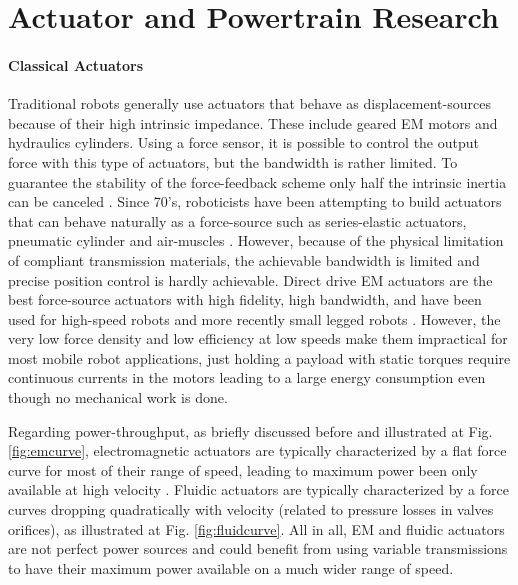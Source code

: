 \section{Actuator and Powertrain Research}
\label{sec:actres}

\paragraph{Classical Actuators} Traditional robots generally use actuators that behave as displacement-sources because of their high intrinsic impedance. These include geared EM motors and hydraulics cylinders. Using a force sensor, it is possible to control the output force with this type of actuators, but the bandwidth is rather limited. To guarantee the stability of the force-feedback scheme only half the intrinsic inertia can be canceled \cite{hogan_impedance_2004}. Since 70's, roboticists have been attempting to build actuators that can behave naturally as a force-source such as series-elastic actuators, pneumatic cylinder and air-muscles \cite{hanafusa_stable_1977}\cite{pratt_series_1995}. However, because of the physical limitation of compliant transmission materials, the achievable bandwidth is limited and precise position control is hardly achievable. Direct drive EM actuators are the best force-source actuators with high fidelity, high bandwidth, and have been used for high-speed robots \cite{asada_direct-drive_1987} and more recently small legged robots \cite{kenneally_design_2016}. However, the very low force density \cite{hollerbach_comparative_1992} and low efficiency at low speeds make them impractical for most mobile robot applications, just holding a payload with static torques require continuous currents in the motors leading to a large energy consumption even though no mechanical work is done. 

Regarding power-throughput, as briefly discussed before and illustrated at Fig. \ref{fig:emcurve}, electromagnetic actuators are typically characterized by a flat force curve for most of their range of speed, leading to maximum power been only available at high velocity \cite{girard_two-speed_2015}. Fluidic actuators are typically characterized by a force curves dropping quadratically with velocity (related to pressure losses in valves orifices), as illustrated at Fig. \ref{fig:fluidcurve}. All in all, EM and fluidic actuators are not perfect power sources and could benefit from using variable transmissions to have their maximum power available on a much wider range of speed.

